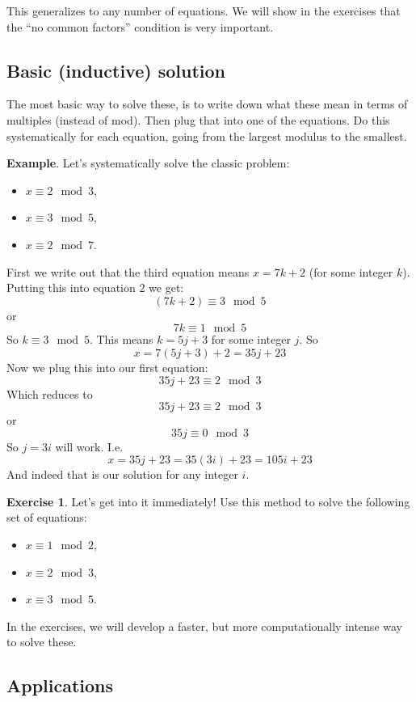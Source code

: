 \documentclass[11pt]{article}
\theoremstyle{definition}
\newtheorem{exercise}{Exercise}
\numberwithin{thm}{section}
\begin{document}
This generalizes to any number of equations. We will show in the exercises that the ``no common factors'' condition is very important.

\subsection{Basic (inductive) solution}

The most basic way to solve these, is to write down what these mean in terms of multiples (instead of mod). Then plug that into one of the equations. Do this systematically for each equation, going from the largest modulus to the smallest.

\textbf{Example}. Let's systematically solve the classic problem:
\begin{itemize}
	\item $x \equiv 2 \mod 3$,
    \item $x \equiv 3 \mod 5$,
    \item $x \equiv 2 \mod 7$.
\end{itemize}

First we write out that the third equation means $x = 7k+2$ (for some integer $k$). Putting this into equation $2$ we get:
\[
	(7k+2) \equiv 3 \mod 5
\]
or 
\[
	7k \equiv 1 \mod 5
\]
So $k \equiv 3 \mod 5$. This means $k= 5j+3$ for some integer $j$. So 
\[
	x = 7(5j + 3) + 2 = 35j + 23
\]
Now we plug this into our first equation:
\[
	35j + 23 \equiv 2 \mod 3
\]
Which reduces to
\[
	35j + 23 \equiv 2 \mod 3
\]
or
\[
	35j \equiv 0 \mod 3
\]
So $j=3i$ will work. I.e.
\[
	x = 35j + 23 = 35(3i)+23 = 105i + 23
\]
And indeed that is our solution for any integer $i$.

\begin{exercise} Let's get into it immediately! Use this method to solve the following set of equations:
\begin{itemize}
	\item $x \equiv 1 \mod 2$,
    \item $x \equiv 2 \mod 3$,
    \item $x \equiv 3 \mod 5$.
\end{itemize}
\end{exercise}

In the exercises, we will develop a faster, but more computationally intense way to solve these.

\subsection{Applications}
\end{document}
